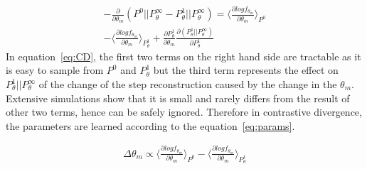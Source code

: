 \documentclass{acm_proc_article-sp}
\begin{document}
\begin{eqnarray}
- \frac {\partial} {\partial\theta_{m}} (P^0 || P^\infty_\theta - P^1_\theta || P^\infty_\theta) = \langle \frac {\partial log f_{\theta_{m}}}{\partial \theta_m} \rangle_{P^0} \label{eq:CD} \\
- \langle \frac {\partial log f_{\theta_{m}}}{\partial \theta_m} \rangle_{P^1_\theta} + \nonumber \frac{\partial{P^1_\theta}}{\partial\theta_m} \frac{\partial(P^1_\theta || P^\infty_\theta)}{\partial{P^1_\theta}}
\end{eqnarray}
In equation~\ref{eq:CD}, the first two terms on the right hand side are tractable as it is easy to sample from $P^0$ and $P^1_\theta$ but the third term represents the effect on $P^1_\theta || P^\infty_\theta$ of the change of the step reconstruction caused by the change in the $\theta_m$. Extensive simulations show that it is small and rarely differs from the result of other two terms, hence can be safely ignored. Therefore in contrastive divergence, the parameters are learned according to the equation~\ref{eq:params}.

\begin{eqnarray}
\Delta\theta_m \propto \langle \frac {\partial log f_{\theta_{m}}}{\partial \theta_m}\rangle_{P^0} - \langle \frac {\partial log f_{\theta_{m}}}{\partial \theta_m} \rangle_{P^1_\theta} \label{eq:params}
\end{eqnarray}


 
\end{document}
